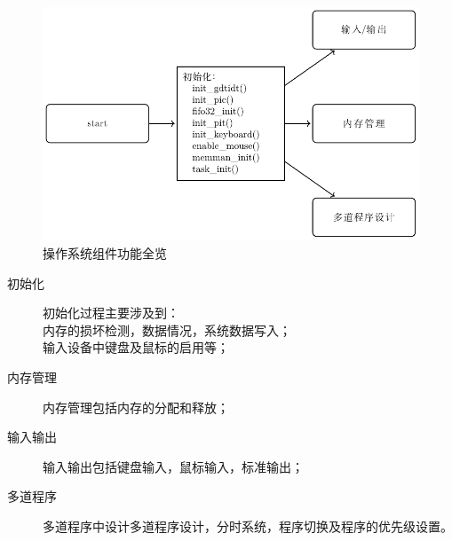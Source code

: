 \begin{figure}[H]
  \centering
  \includegraphics[width=.8\textwidth]{fig/func/run.pdf}
  \caption{操作系统组件功能全览}
  \label{fig:run}
\end{figure}

\begin{description}
  \item[初始化] 初始化过程主要涉及到：\\
  内存的损坏检测，数据情况，系统数据写入；\\
  输入设备中键盘及鼠标的启用等；
  \item[内存管理] 内存管理包括内存的分配和释放；
  \item[输入输出] 输入输出包括键盘输入，鼠标输入，标准输出；
  \item[多道程序] 多道程序中设计多道程序设计，分时系统，程序切换及程序的优先级设置。
\end{description}